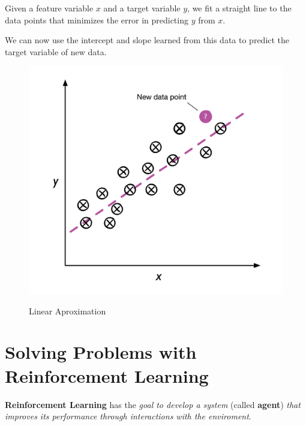 \documentclass[../machine_learning_scikit.tex]{subfiles}
\begin{document}
    Given a feature variable $x$ and a target variable $y$, we fit a straight line to the data points that minimizes the error in predicting $y$ from $x$.

    We can now use the intercept and slope learned from this data to predict the target variable of new data.

    \begin{figure}[h]
        \begin{minipage}{\textwidth}
            \centering
            \includegraphics[scale=1]{images/linear_aproximation.png} \\
            \caption{Linear Aproximation}
            \label{figure:linear_aproximation}
        \end{minipage}
    \end{figure}

    \section{Solving Problems with Reinforcement Learning}

    \begin{mydef}
        \textbf{Reinforcement Learning} has the \textit{goal to develop a system} (called \textbf{agent}) \textit{that improves its performance through interactions with the enviroment}.
    \end{mydef}
\end{document}
